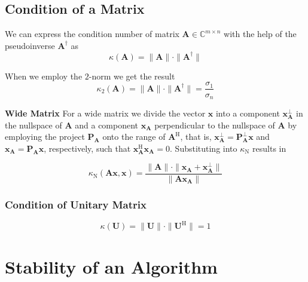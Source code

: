 \documentclass[english]{latex4ei/latex4ei_sheet}
\begin{document}
\begin{sectionbox}
\subsection{Condition of a Matrix}
We can express the condition number of matrix $\mathbf{A}\in\mathbb{C}^{m \times n}$ with the help of the pseudoinverse $\mathbf{A}^\dagger$ as 
$$\kappa(\mathbf{A}) = \parallel\mathbf{A}\parallel\cdot\parallel \mathbf{A}^\dagger\parallel$$

When we employ the $2$-norm we get the result
$$\kappa_2(\mathbf{A}) = \parallel\mathbf{A}\parallel\cdot\parallel \mathbf{A}^\dagger\parallel = \frac{\sigma_1}{\sigma_n}$$

\textbf{Wide Matrix}
For a wide matrix we divide the vector $\mathbf{x}$ into a component $\mathbf{x}^\perp_\mathbf{A}$ in the nullspace of $\mathbf{A}$ and a component $\mathbf{x}_\mathbf{A}$ perpendicular to the nullspace of $\mathbf{A}$ by employing the project $\mathbf{P}_\mathbf{A}$ onto the range of $\mathbf{A}^\text{H}$, that is, $\mathbf{x}^\perp_\mathbf{A} = \mathbf{P}^\perp_\mathbf{A}\mathbf{x}$ and $\mathbf{x}_\mathbf{A} = \mathbf{P}_\mathbf{A}\mathbf{x}$, respectively, such that $\mathbf{x}^\text{H}_\mathbf{A}\mathbf{x}_\mathbf{A} = 0$. Substituting into $\kappa_\text{N}$ results in

$$\kappa_\text{N}(\mathbf{A}\mathbf{x}, \mathbf{x}) = \frac{\parallel\mathbf{A}\parallel\cdot\parallel\mathbf{x}_\mathbf{A} + \mathbf{x}^\perp_\mathbf{A}\parallel}{\parallel\mathbf{A}\mathbf{x}_\mathbf{A}\parallel}$$

\subsubsection{Condition of Unitary Matrix}
$$\kappa(\mathbf{U}) = \parallel\mathbf{U}\parallel\cdot\parallel \mathbf{U}^\text{H}\parallel = 1$$
\end{sectionbox}
\section{Stability of an Algorithm}

\end{document}
